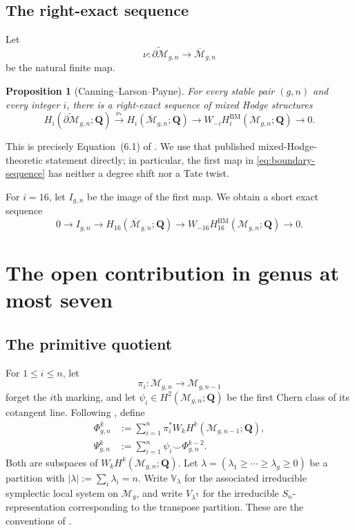 \documentclass[12pt,reqno]{amsart}
\newcommand{\Q}{\mathbf{Q}}
\newcommand{\M}{\mathcal{M}}
\newcommand{\Mbar}{\overline{\mathcal{M}}}
\newcommand{\BM}{\mathrm{BM}}
\newtheorem{proposition}[theorem]{Proposition}
\theoremstyle{definition}
\theoremstyle{remark}
\begin{document}
\subsection{The right-exact sequence}

Let
\[
 \nu\colon\widetilde{\partial\M}_{g,n}\longrightarrow\Mbar_{g,n}
\]
be the natural finite map.

\begin{proposition}[Canning--Larson--Payne]\label{prop:boundary-sequence}
For every stable pair $(g,n)$ and every integer $i$, there is a right-exact
sequence of mixed Hodge structures
\begin{equation}\label{eq:boundary-sequence}
 H_i(\widetilde{\partial\M}_{g,n};\Q)
 \xrightarrow{\nu_*}
 H_i(\Mbar_{g,n};\Q)
 \longrightarrow
 W_{-i}H_i^{\BM}(\M_{g,n};\Q)
 \longrightarrow0.
\end{equation}
\end{proposition}

This is precisely Equation~(6.1) of \cite{CLP}.  We use that published
mixed-Hodge-theoretic statement directly; in particular, the first map in
\eqref{eq:boundary-sequence} has neither a degree shift nor a Tate twist.

For $i=16$, let $I_{g,n}$ be the image of the first map.  We obtain a short
exact sequence
\begin{equation}\label{eq:boundary-short}
 0\longrightarrow I_{g,n}
 \longrightarrow H_{16}(\Mbar_{g,n};\Q)
 \longrightarrow W_{-16}H_{16}^{\BM}(\M_{g,n};\Q)
 \longrightarrow0.
\end{equation}

\section{The open contribution in genus at most seven}
\label{sec:open}

\subsection{The primitive quotient}

For $1\leq i\leq n$, let
\[
 \pi_i\colon\M_{g,n}\longrightarrow\M_{g,n-1}
\]
forget the $i$th marking, and let $\psi_i\in H^2(\M_{g,n};\Q)$ be the first
Chern class of its cotangent line.  Following \cite[Sections~2 and 3]{CLP},
define
\begin{align}
 \Phi^k_{g,n}
   &:=\sum_{i=1}^n\pi_i^*W_kH^k(\M_{g,n-1};\Q),
   \label{eq:Phi}\\
 \Psi^k_{g,n}
   &:=\sum_{i=1}^n\psi_i\smile\Phi^{k-2}_{g,n}.
   \label{eq:Psi}
\end{align}
Both are subspaces of $W_kH^k(\M_{g,n};\Q)$.  Let
$\lambda=(\lambda_1\geq\cdots\geq\lambda_g\geq0)$ be a partition with
$|\lambda|:=\sum_i\lambda_i=n$.  Write $\mathbb V_\lambda$ for the
associated irreducible symplectic local system on $\M_g$, and write
$V_{\lambda^{\mathsf T}}$ for the irreducible $S_n$-representation
corresponding to the transpose partition.  These are the conventions of
\cite[Section~3]{CLP}.
\end{document}
